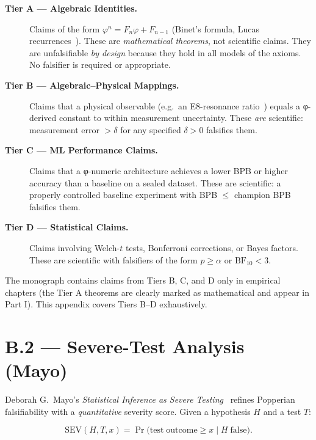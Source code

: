 \begin{description}
  \item[\textbf{Tier A — Algebraic Identities.}]  Claims of the form
    $\varphi^{n} = F_n \varphi + F_{n-1}$ (Binet's formula,
    Lucas recurrences~\cite{lucas1878}).  These are \emph{mathematical
    theorems}, not scientific claims.  They are unfalsifiable \emph{by design}
    because they hold in all models of the axioms.  No falsifier is required or
    appropriate.

  \item[\textbf{Tier B — Algebraic–Physical Mappings.}]  Claims that a
    physical observable (e.g.\ an E8-resonance ratio~\cite{coldea2010}) equals a
    φ-derived constant to within measurement uncertainty.  These \emph{are}
    scientific: measurement error $> \delta$ for any specified $\delta > 0$
    falsifies them.

  \item[\textbf{Tier C — ML Performance Claims.}]  Claims that a φ-numeric
    architecture achieves a lower BPB or higher accuracy than a baseline on a
    sealed dataset.  These are scientific: a properly controlled baseline
    experiment with BPB $\leq$ champion BPB falsifies them.

  \item[\textbf{Tier D — Statistical Claims.}]  Claims involving Welch-$t$
    tests, Bonferroni corrections, or Bayes factors.  These are scientific
    with falsifiers of the form $p \geq \alpha$ or $\mathrm{BF}_{10} < 3$.
\end{description}

\noindent The monograph contains claims from Tiers B, C, and D only in empirical
chapters (the Tier A theorems are clearly marked as mathematical and appear
in Part I).  This appendix covers Tiers B--D exhaustively.

\section*{B.2 — Severe-Test Analysis (Mayo)}
\label{sec:severe-test}

Deborah G.\ Mayo's \emph{Statistical Inference as Severe
Testing}~\cite{mayo2018severe} refines Popperian falsifiability with a
\emph{quantitative} severity score.  Given a hypothesis $H$ and a test $T$:

\begin{equation}\label{eq:sev}
\mathrm{SEV}(H, T, x) = \Pr\!\bigl(\mathrm{test\;outcome} \geq x \mid H\;\text{false}\bigr).
\end{equation}

